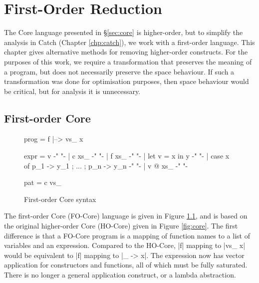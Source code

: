 

\chapter{First-Order Reduction}

The Core language presented in \S\ref{sec:core} is higher-order, but to simplify the analysis in Catch (Chapter \ref{chp:catch}), we work with a first-order language. This chapter gives alternative methods for removing higher-order constructs. For the purposes of this work, we require a transformation that preserves the meaning of a program, but does not necessarily preserve the space behaviour. If such a transformation was done for optimisation purposes, then space behaviour would be critical, but for analysis it is unnecessary.

\section{First-order Core}

\begin{figure}
\begin{code}
prog  =  f |--> vs_ x

expr  =  v                                          {-"  "-}
      |  c xs_                                      {-"  "-}
      |  f xs_                                      {-"  "-}
      |  let v = x in y                             {-"  "-}
      |  case x of {p_1 -> y_1 ; ... ; p_n -> y_n}  {-"  "-}
      |  v @ xs_                                    {-"  "-}

pat   =  c vs_
\end{code}
\caption{First-order Core syntax}
\label{fig:fo_core}
\end{figure}

The first-order Core (FO-Core) language is given in Figure \ref{fig:fo_core}, and is based on the original higher-order Core (HO-Core) given in Figure \ref{fig:core}. The first difference is that a FO-Core program is a mapping of function names to a list of variables and an expression. Compared to the HO-Core, |f| mapping to |vs_ x| would be equivalent to |f| mapping to |\vs_ -> x|. The expression now has vector application for constructors and functions, all of which must be fully saturated. There is no longer a general application construct, or a lambda abstraction.

